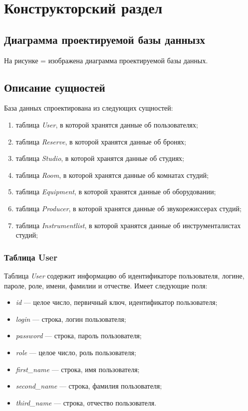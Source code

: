 \chapter{Конструкторский раздел}
\section{Диаграмма проектируемой базы даннызх}
На рисунке = изображена диаграмма проектируемой базы данных.
\section{Описание сущностей}
База данных спроектирована из следующих сущностей:
\begin{enumerate}
	\item таблица \textit{User}, в которой хранятся данные об пользователях;
	\item таблица \textit{Reserve}, в которой хранятся данные об бронях;
	\item таблица \textit{Studio}, в которой хранятся данные об студиях;
	\item таблица \textit{Room}, в которой хранятся данные об комнатах студий;
	\item таблица \textit{Equipment}, в которой хранятся данные об оборудовании;
	\item таблица \textit{Producer}, в которой хранятся данные об звукорежиссерах студий;
	\item таблица \textit{Instrumentlist}, в которой хранятся данные об инструменталистах студий;
\end{enumerate}
\subsection{Таблица User}
Таблица \textit{User} содержит информацию об идентификаторе пользователя, логине, пароле, роле, имени, фамилии и отчестве.
Имеет следующие поля:
\begin{itemize}
	\item \textit{id} --- целое число, первичный ключ, идентификатор пользователя;
	\item \textit{login} --- строка, логин пользователя;
	\item \textit{password} --- строка, пароль пользователя;
	\item \textit{role} --- целое число, роль пользователя;
	\item \textit{first\_name} --- строка, имя пользователя;
	\item \textit{second\_name} --- строка, фамилия пользователя;
	\item \textit{third\_name} --- строка, отчество пользователя.
\end{itemize}
